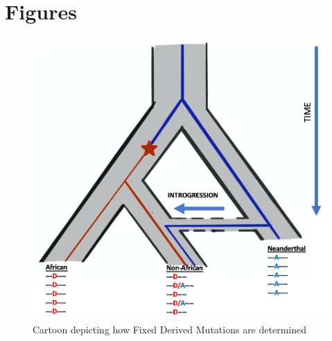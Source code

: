 \section{Figures}
\begin{figure}[htb]
    \centering
    \includegraphics[width=\textwidth]{chapter4/figures/fig4.1.png}
    \caption{Cartoon depicting how Fixed Derived Mutations are determined}
    \label{fig:4.1}
\end{figure}

